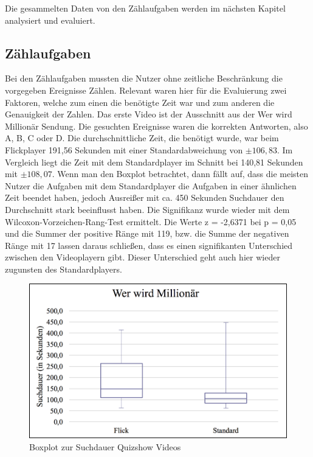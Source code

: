 \documentclass[11pt,a4paper]{report}
\begin{document}
Die gesammelten Daten von den Zählaufgaben werden im nächsten Kapitel analysiert und evaluiert.

\subsection{Zählaufgaben}

Bei den Zählaufgaben mussten die Nutzer ohne zeitliche Beschränkung die vorgegeben Ereignisse Zählen. Relevant waren hier für die Evaluierung zwei Faktoren, welche zum einen die benötigte Zeit war und zum anderen die Genauigkeit der Zahlen. Das erste Video ist der Ausschnitt aus der Wer wird Millionär Sendung. Die gesuchten Ereignisse waren die korrekten Antworten, also A, B, C oder D. Die durchschnittliche Zeit, die benötigt wurde, war beim Flickplayer 191,56 Sekunden mit einer Standardabweichung von $\pm 106,83$. Im Vergleich liegt die Zeit mit dem Standardplayer im Schnitt bei 140,81 Sekunden mit $\pm 108,07$. Wenn man den Boxplot betrachtet, dann fällt auf, dass die meisten Nutzer die Aufgaben mit dem Standardplayer die Aufgaben in einer ähnlichen Zeit beendet haben, jedoch Ausreißer mit ca. 450 Sekunden Suchdauer den Durchschnitt stark beeinflusst haben. Die Signifikanz wurde wieder mit dem Wilcoxon-Vorzeichen-Rang-Test ermittelt. Die Werte z = -2,6371 bei p = 0,05 und die Summer der positive Ränge mit 119, bzw. die Summe der negativen Ränge mit 17 lassen daraus schließen, dass es einen signifikanten Unterschied zwischen den Videoplayern gibt. Dieser Unterschied geht auch hier wieder zugunsten des Standardplayers.
\begin{figure}[h]
\begin{center}
\includegraphics[scale=0.9]{./images/35.png}
\caption{Boxplot zur Suchdauer Quizshow Videos}
\label{boxplot_quizshow}
\end{center}
\end{figure}
\end{document}
